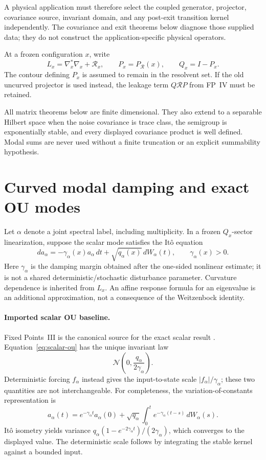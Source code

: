 \documentclass[11pt]{article}
\begin{document}
A physical application must therefore select the coupled generator,
projector, covariance source, invariant domain, and any post-exit transition
kernel independently.  The covariance and exit theorems below diagnose those
supplied data; they do not construct the application-specific physical operators.

At a frozen configuration $x$, write
\[
 L_x=\nabla_x^\ast\nabla_x+\mathcal R_x,
 \qquad P_x=P_{\mathcal R}(x),\qquad Q_x=I-P_x .
\]
The contour defining $P_x$ is assumed to remain in the resolvent set. If the
old uncurved projector is used instead, the leakage term $Q\mathcal RP$ from
FP~IV must be retained.

All matrix theorems below are finite dimensional. They also extend to a
separable Hilbert space when the noise covariance is trace class, the
semigroup is exponentially stable, and every displayed covariance product is
well defined. Modal sums are never used without a finite truncation or an
explicit summability hypothesis.

\section{Curved modal damping and exact OU modes}

Let $\alpha$ denote a joint spectral label, including multiplicity. In a
frozen $Q_x$-sector linearization, suppose the scalar mode satisfies the It\^o
equation
\begin{equation}
 da_\alpha=-\gamma_\alpha(x)a_\alpha\,dt
              +\sqrt{q_\alpha(x)}\,dW_\alpha(t),
 \qquad \gamma_\alpha(x)>0 .
 \label{eq:scalar-ou}
\end{equation}
Here $\gamma_\alpha$ is the damping margin obtained after the one-sided
nonlinear estimate; it is not a shared deterministic/stochastic disturbance
parameter. Curvature dependence is inherited from $L_x$. An affine response
formula for an eigenvalue is an additional approximation, not a consequence
of the Weitzenbock identity.

\paragraph{Imported scalar OU baseline.}
Fixed Points~III is the canonical source for the exact scalar result
\cite{FP3}. Equation~\eqref{eq:scalar-ou} has the unique invariant law
\[
 \mathcal N\!\left(0,\frac{q_\alpha}{2\gamma_\alpha}\right).
\]
Deterministic forcing $f_\alpha$ instead gives the input-to-state scale
$|f_\alpha|/\gamma_\alpha$; these two quantities are not interchangeable.
For completeness, the variation-of-constants representation is
\[
 a_\alpha(t)=e^{-\gamma_\alpha t}a_\alpha(0)
 +\sqrt{q_\alpha}\int_0^t e^{-\gamma_\alpha(t-s)}\,dW_\alpha(s).
\]
It\^o isometry yields variance
$q_\alpha(1-e^{-2\gamma_\alpha t})/(2\gamma_\alpha)$, which converges to the
displayed value. The deterministic scale follows by integrating the stable
kernel against a bounded input.
\end{document}
